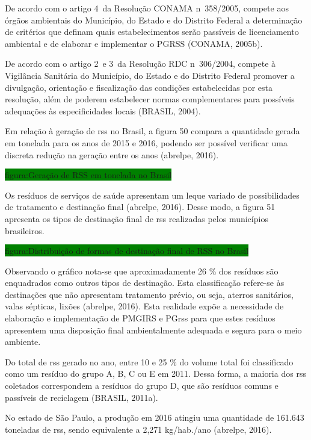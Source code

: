	De acordo com o artigo 4\textdegree\ da Resolução CONAMA n\textdegree\ 358/2005, compete aos órgãos ambientais do Município, do Estado e do Distrito Federal a determinação de critérios que definam quais estabelecimentos serão passíveis de licenciamento ambiental e de elaborar e implementar o PGRSS (CONAMA, 2005b).
	
	De acordo com o artigo 2\textdegree\ e 3\textdegree\ da Resolução RDC n\textdegree\ 306/2004, compete à Vigilância Sanitária do Município, do Estado e do Distrito Federal promover a divulgação, orientação e fiscalização das condições estabelecidas por esta resolução, além de poderem estabelecer normas complementares para possíveis adequações às especificidades locais (BRASIL, 2004).

	Em relação à geração de \gls{rss} no Brasil, a figura 50 compara a quantidade gerada em tonelada para os anos de 2015 e 2016, podendo ser possível verificar uma discreta redução na geração entre os anos (\gls{abrelpe}, 2016).
	
	\colorbox{green}{figura:Geração de RSS em tonelada no Brasil}
	
	Os resíduos de serviços de saúde apresentam um leque variado de possibilidades de tratamento e destinação final (\gls{abrelpe}, 2016). Desse modo, a figura 51 apresenta os tipos de destinação final de \gls{rss} realizadas pelos municípios brasileiros.
	
	\colorbox{green}{figura:Distribuição de formas de destinação final de RSS no Brasil}
	
	Observando o gráfico nota-se que aproximadamente 26 \% dos resíduos são enquadrados como outros tipos de destinação. Esta classificação refere-se às destinações que não apresentam tratamento prévio, ou seja, aterros sanitários, valas sépticas, lixões (\gls{abrelpe}, 2016). Esta realidade expõe a necessidade de elaboração e implementação de PMGIRS e PG\gls{rss} para que estes resíduos apresentem uma disposição final ambientalmente adequada e segura para o meio ambiente.

	Do total de \gls{rss} gerado no ano, entre 10 e 25 \% do volume total foi classificado como um resíduo do grupo A, B, C ou E em 2011. Dessa forma, a maioria dos \gls{rss} coletados correspondem a resíduos do grupo D, que são resíduos comuns e passíveis de reciclagem (BRASIL, 2011a).
	
	No estado de São Paulo, a produção em 2016 atingiu uma quantidade de 161.643 toneladas de \gls{rss}, sendo equivalente a 2,271 kg/hab./ano (\gls{abrelpe}, 2016).
	
